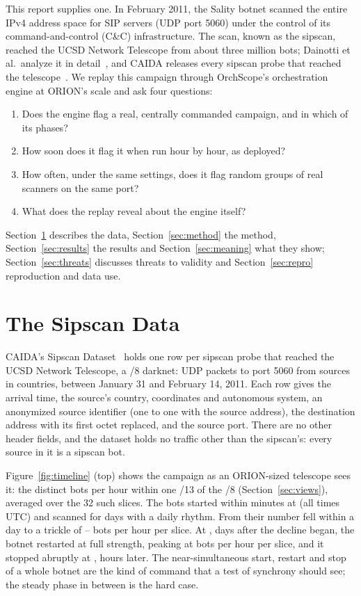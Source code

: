 \documentclass[11pt]{article}
\newcommand{\sysname}{OrchScope}
\begin{document}
This report supplies one. In February 2011, the Sality botnet scanned the entire IPv4 address
space for SIP servers (UDP port 5060) under the control of its command-and-control (C\&C)
infrastructure. The scan, known as the sipscan, reached the UCSD Network Telescope from about
three million bots; Dainotti et al.\ analyze it in
detail~\cite{dainotti2012imc,dainotti2015ton}, and CAIDA releases every sipscan probe that reached
the telescope~\cite{caida_sipscan}. We replay this campaign through \sysname's orchestration engine
at ORION's scale and ask four questions:
\begin{enumerate}
\item Does the engine flag a real, centrally commanded campaign, and in which of its phases?
\item How soon does it flag it when run hour by hour, as deployed?
\item How often, under the same settings, does it flag random groups of real scanners on the
same port?
\item What does the replay reveal about the engine itself?
\end{enumerate}
Section~\ref{sec:data} describes the data, Section~\ref{sec:method} the method,
Section~\ref{sec:results} the results and Section~\ref{sec:meaning} what they show;
Section~\ref{sec:threats} discusses threats to validity and Section~\ref{sec:repro} reproduction
and data use.

\section{The Sipscan Data}
\label{sec:data}

CAIDA's Sipscan Dataset~\cite{caida_sipscan} holds one row per sipscan probe that reached the
UCSD Network Telescope, a /8 darknet: \SipPackets{} UDP packets to port 5060 from \SipBots{}
sources in \SipCountries{} countries, between January 31 and February 14, 2011. Each row gives
the arrival time, the source's country, coordinates and autonomous system, an anonymized source
identifier (one to one with the source address), the destination address with its first octet
replaced, and the source port. There are no other header fields, and the dataset holds no traffic
other than the sipscan's: every source in it is a sipscan bot.

Figure~\ref{fig:timeline} (top) shows the campaign as an ORION-sized telescope sees it: the
distinct bots per hour within one /13 of the /8 (Section~\ref{sec:views}), averaged over the 32
such slices. The bots started within minutes at \SipOnsetTime{} (all times UTC) and scanned for
\SipSteadyDays{} days with a daily rhythm. From \SipDeclineTime{} their number fell within a day
to a trickle of \SipIdleLo--\SipIdleHi{} bots per hour per slice. At \SipRestartTime, \SipIdleDays{}
days after the decline began, the botnet restarted at full strength, peaking at \SipPeakSlice{}
bots per hour per slice, and it stopped abruptly at \SipStopTime, \SipRestartHours{} hours later.
The
near-simultaneous start, restart and stop of a whole botnet are the kind of command that a test of
synchrony should see; the steady phase in between is the hard case.
\end{document}
